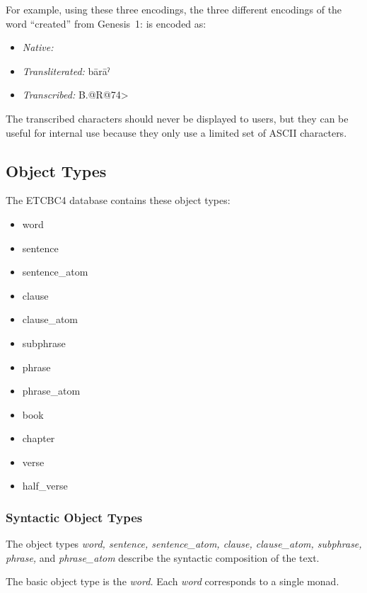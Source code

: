 \documentclass[11pt,oneside,a4paper]{memoir}
\newcommand*{\bibleref}[3]{#1~#2\thinspace:\thinspace#3}
\newcommand{\heb}[1]{{\RL {\ezr #1}}}
\begin{document}
For example, using these three encodings, the three different encodings of the word ``created'' from
\bibleref{Genesis}{1}{1} is encoded as:

\begin{itemize}
\item \emph{Native:} \heb{בָּרָ֣א}
\item \emph{Transliterated:} bārāˀ
\item \emph{Transcribed:} B.@R@74>
\end{itemize}

The transcribed characters should never be displayed to users, but they can be useful for internal
use because they only use a limited set of ASCII characters.


\subsection{Object Types}

The ETCBC4 database contains these object types:

\begin{itemize}
\item word
\item sentence
\item sentence\_atom
\item clause
\item clause\_atom
\item subphrase
\item phrase
\item phrase\_atom
\item book
\item chapter
\item verse
\item half\_verse
\end{itemize}

\subsubsection{Syntactic Object Types}

The object types \emph{word, sentence, sentence\_atom, clause, clause\_atom, subphrase, phrase,} and
\emph{phrase\_atom} describe the syntactic composition of the text.


The basic object type is the \emph{word.} Each \emph{word} corresponds to a single
monad.
\end{document}
